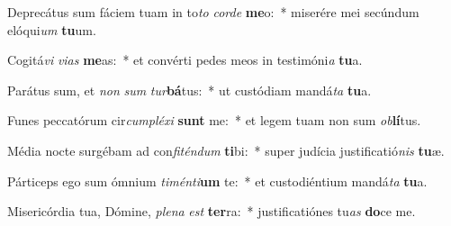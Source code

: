 \item Deprecátus sum fáciem tuam in to\textit{to} \textit{cor}\textit{de} \textbf{me}o:~* miserére mei secúndum elóqui\textit{um} \textbf{tu}um.
\item Cogitá\textit{vi} \textit{vi}\textit{as} \textbf{me}as:~* et convérti pedes meos in testimóni\textit{a} \textbf{tu}a.
\item Parátus sum, et \textit{non} \textit{sum} \textit{tur}\textbf{bá}tus:~* ut custódiam mandá\textit{ta} \textbf{tu}a.
\item Funes peccatórum cir\textit{cum}\textit{plé}\textit{xi} \textbf{sunt} me:~* et legem tuam non sum \textit{ob}\textbf{lí}tus.
\item Média nocte surgébam ad con\textit{fi}\textit{tén}\textit{dum} \textbf{ti}bi:~* super judícia justificatió\textit{nis} \textbf{tu}æ.
\item Párticeps ego sum ómnium \textit{ti}\textit{mén}\textit{ti}\textbf{um} te:~* et custodiéntium mandá\textit{ta} \textbf{tu}a.
\item Misericórdia tua, Dómine, \textit{ple}\textit{na} \textit{est} \textbf{ter}ra:~* justificatiónes tu\textit{as} \textbf{do}ce me.

